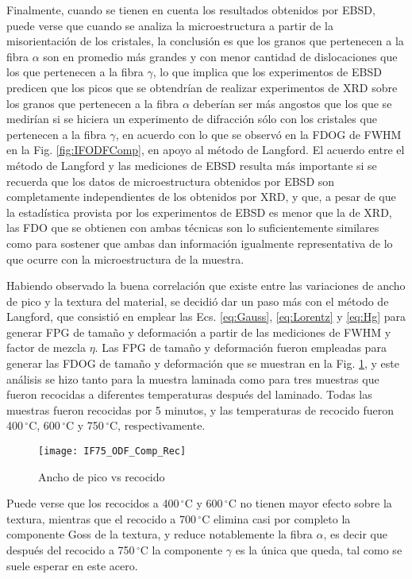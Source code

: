 Finalmente, cuando se tienen en cuenta los resultados obtenidos por EBSD, puede verse que cuando se analiza la microestructura a partir de la misorientación de los cristales, la conclusión es que los granos que pertenecen a la fibra $\alpha$ son en promedio más grandes y con menor cantidad de dislocaciones que los que pertenecen a la fibra $\gamma$, lo que implica que los experimentos de EBSD predicen que los picos que se obtendrían de realizar experimentos de XRD sobre los granos que pertenecen a la fibra $\alpha$ deberían ser más angostos que los que se medirían si se hiciera un experimento de difracción sólo con los cristales que pertenecen a la fibra $\gamma$, en acuerdo con lo que se observó en la FDOG de FWHM en la Fig. \ref{fig:IFODFComp}, en apoyo al método de Langford.
El acuerdo entre el método de Langford y las mediciones de EBSD resulta más importante si se recuerda que los datos de microestructura obtenidos por EBSD son completamente independientes de los obtenidos por XRD, y que, a pesar de que la estadística provista por los experimentos de EBSD es menor que la de XRD, las FDO que se obtienen con ambas técnicas son lo suficientemente similares como para sostener que ambas dan información igualmente representativa de lo que ocurre con la microestructura de la muestra.

Habiendo observado la buena correlación que existe entre las variaciones de ancho de pico y la textura del material, se decidió dar un paso más con el método de Langford, que consistió en emplear las Ecs. \ref{eq:Gauss}, \ref{eq:Lorentz} y \ref{eq:Hg} para generar FPG de tamaño y deformación a partir de las mediciones de FWHM y factor de mezcla $\eta$.
Las FPG de tamaño y deformación fueron empleadas para generar las FDOG de tamaño y deformación que se muestran en la Fig. \ref{fig:IFMicroRecocido}, y este análisis se hizo tanto para la muestra laminada como para tres muestras que fueron recocidas a diferentes temperaturas después del laminado.
Todas las muestras fueron recocidas por 5 minutos, y las temperaturas de recocido fueron 400\,$^{\circ}$C, 600\,$^{\circ}$C y 750\,$^{\circ}$C, respectivamente.

\begin{figure}[!htb]
  \centering
  \texttt{[image: IF75\_ODF\_Comp\_Rec]}
  \caption{Ancho de pico vs recocido}
  \label{fig:IFMicroRecocido}
\end{figure}

Puede verse que los recocidos a 400\,$^{\circ}$C y 600\,$^{\circ}$C no tienen mayor efecto sobre la textura, mientras que el recocido a 700\,$^{\circ}$C elimina casi por completo la componente Goss de la textura, y reduce notablemente la fibra $\alpha$, es decir que después del recocido a 750\,$^{\circ}$C la componente $\gamma$ es la única que queda, tal como se suele esperar en este acero.

